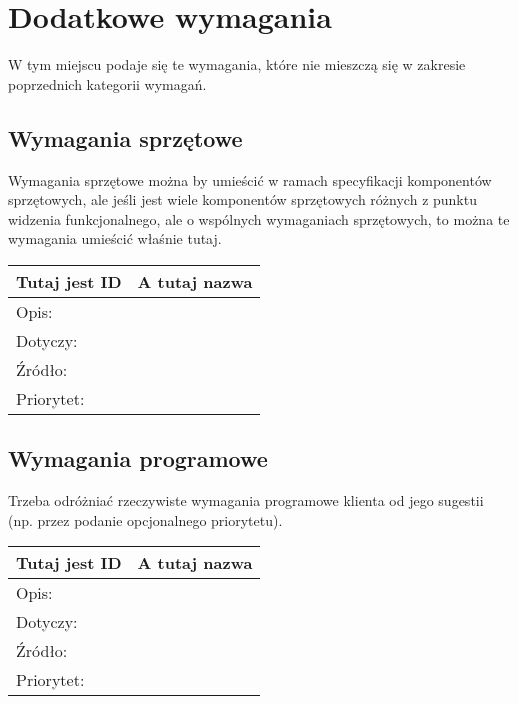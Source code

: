 \documentclass[a4paper,10pt]{article}
\begin{document}
\section{Dodatkowe wymagania}

W tym miejscu podaje się te wymagania, które nie mieszczą się w zakresie poprzednich kategorii wymagań.

\subsection{Wymagania sprzętowe}

Wymagania sprzętowe można by umieścić w ramach specyfikacji komponentów sprzętowych, ale jeśli jest wiele komponentów sprzętowych różnych z punktu widzenia funkcjonalnego, ale o wspólnych wymaganiach sprzętowych, to można te wymagania umieścić właśnie tutaj.

\begin{center}
\begin{tabular}{|l|l|} \hline

Tutaj jest ID & A tutaj nazwa \\ \hline
Opis: &  \\ \hline
Dotyczy: &  \\ \hline
Źródło: &  \\ \hline
Priorytet: &  \\ \hline

\end{tabular}
\end{center}

\subsection{Wymagania programowe}

Trzeba odróżniać rzeczywiste wymagania programowe klienta od jego sugestii (np. przez podanie opcjonalnego priorytetu).

\begin{center}
\begin{tabular}{|l|l|} \hline

Tutaj jest ID & A tutaj nazwa \\ \hline
Opis: &  \\ \hline
Dotyczy: &  \\ \hline
Źródło: &  \\ \hline
Priorytet: &  \\ \hline

\end{tabular}
\end{center}
\end{document}

